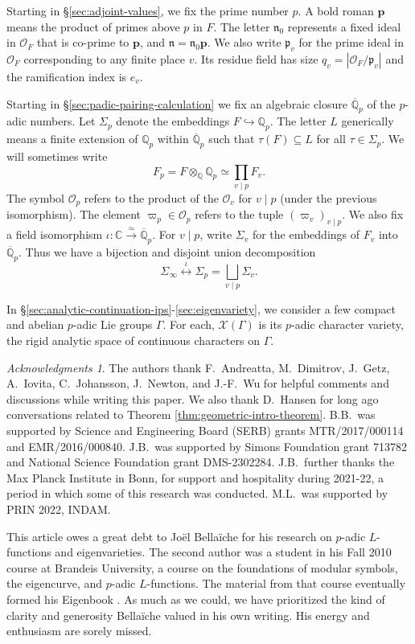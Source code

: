 \documentclass[10pt, twoside]{amsart}
\theoremstyle{plain}
\theoremstyle{definition}
\theoremstyle{remark}
\newtheorem*{ack}{Acknowledgments}
\numberwithin{equation}{subsection}
\def\Q{\mathbb Q}
\def\C{\mathbb C}
\def\p{\mathbf{p}}
\def\gp{\mathfrak p}
\def\gn{\mathfrak n}
\def\scro{\mathscr O}
\def\scro{\mathscr O}
\def\scrx{\mathscr X}
\def\qpbar{\overline{\mathbb Q}_p}
\begin{document}
Starting in \S \ref{sec:adjoint-values}, we fix the prime number $p$. A bold roman $\p$ means the product of primes above $p$ in $F$. The letter $\gn_0$ represents a fixed ideal in $\scro_F$ that is co-prime to $\p$, and $\gn = \gn_0 \p$. We also write $\gp_v$ for the prime ideal in $\scro_F$ corresponding to any finite place $v$. Its residue field has size $q_v = |\scro_F/\gp_v|$ and the ramification index is $e_v$.

Starting in \S \ref{sec:padic-pairing-calculation} we fix an algebraic closure $\qpbar$ of the $p$-adic numbers. Let $\Sigma_p$ denote the embeddings $F \hookrightarrow \Q_p$. The letter $L$ generically means a finite extension of $\Q_p$ within $\qpbar$ such that $\tau(F) \subseteq L$ for all $\tau \in \Sigma_p$. We will sometimes write 
$$
F_p = F \otimes_{\Q} \Q_p \simeq \prod_{v \mid p} F_v.
$$
The symbol $\scro_p$ refers to the product of the $\scro_v$ for $v \mid p$ (under the previous isomorphism). The element $\varpi_p \in \scro_p$ refers to the tuple $(\varpi_v)_{v \mid p}$. We also fix a field isomorphism $\iota: \C \xrightarrow{\simeq} \qpbar$. For $v \mid p$, write $\Sigma_v$ for the embeddings of $F_v$ into $\qpbar$. Thus we have a bijection and disjoint union decomposition
$$
\Sigma_{\infty} \overset{\iota}{\longleftrightarrow} \Sigma_p = \bigsqcup_{v\mid p} \Sigma_v.
$$

In \S \ref{sec:analytic-continuation-ips}-\ref{sec:eigenvariety}, we consider a few compact and abelian $p$-adic Lie groups $\Gamma$. For each, $\scrx(\Gamma)$ is its $p$-adic character variety, the rigid analytic space of continuous characters on $\Gamma$.

\begin{ack}
The authors thank F.\ Andreatta, M.\ Dimitrov, J.\ Getz, A.\ Iovita, C.\ Johansson, J.\ Newton, and J.-F.\ Wu for helpful comments and discussions while writing this paper. We also thank D.\ Hansen for long ago conversations related to Theorem \ref{thm:geometric-intro-theorem}. B.B.\ was supported by Science and Engineering Board (SERB) grants MTR/2017/000114 and EMR/2016/000840. J.B.\ was supported by Simons Foundation grant 713782 and National Science Foundation grant DMS-2302284. J.B.\ further thanks the Max Planck Institute in Bonn, for support and hospitality during 2021-22, a period in which some of this research was conducted.  M.L.\ was supported by PRIN 2022, INDAM. 

This article owes a great debt to Jo\"el Bella\"iche for his research on $p$-adic $L$-functions and eigenvarieties. The second author was a student in his Fall 2010 course at Brandeis University, a course on the foundations of modular symbols, the eigencurve, and $p$-adic $L$-functions. The material from that course eventually formed his Eigenbook \cite{Bel}. As much as we could, we have prioritized the kind of clarity and generosity Bella\"iche valued in his own writing. His energy and enthusiasm are sorely missed.
\end{ack}
\end{document}
